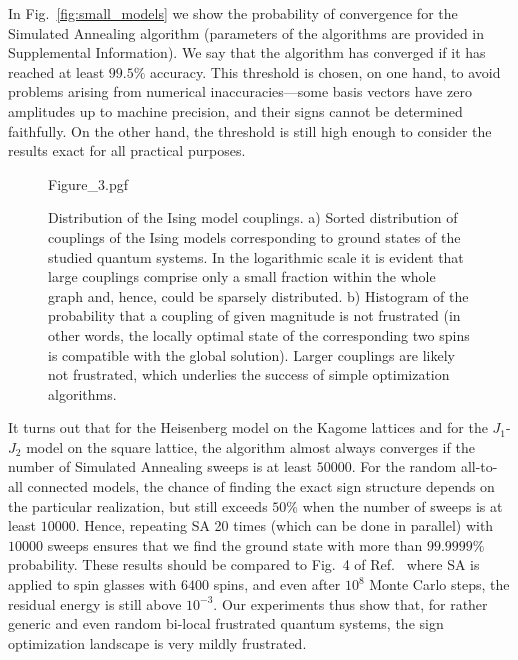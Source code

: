 In Fig.~\ref{fig:small_models} we show the probability of convergence for the Simulated Annealing algorithm (parameters of the algorithms are provided in Supplemental Information). We say that the algorithm has converged if it has reached at least $99.5\%$ accuracy. This threshold is chosen, on one hand, to avoid problems arising from numerical inaccuracies---some basis vectors have zero amplitudes up to machine precision, and their signs cannot be determined faithfully. On the other hand, the threshold is still high enough to consider the results exact for all practical purposes.

\begin{figure}
    \centering
    {Figure_3.pgf}%
    \caption{Distribution of the Ising model couplings. a) Sorted distribution of couplings of the Ising models corresponding to ground states of the studied quantum systems. In the logarithmic scale it is evident that large couplings comprise only a small fraction within the whole graph and, hence, could be sparsely distributed. b) Histogram of the probability that a coupling of given magnitude is not frustrated (in other words, the locally optimal state of the corresponding two spins is compatible with the global solution). Larger couplings are likely not frustrated, which underlies the success of simple optimization algorithms.}
    \label{fig:coupling_distribution}
\end{figure}

It turns out that for the Heisenberg model on the Kagome lattices and for the $J_1$-$J_2$ model on the square lattice, the algorithm almost always converges if the number of Simulated Annealing sweeps is at least $50000$. For the random all-to-all connected models, the chance of finding the exact sign structure depends on the particular realization, but still exceeds $50\%$ when the number of sweeps is at least $10000$. Hence, repeating SA 20 times (which can be done in parallel) with $10000$ sweeps ensures that we find the ground state with more than $99.9999\%$ probability. These results should be compared to Fig.~4 of Ref.~\cite{heim2015quantum} where SA is applied to spin glasses with $6400$ spins, and even after $10^8$ Monte Carlo steps, the residual energy is still above $10^{-3}$. Our experiments thus show that, for rather generic and even random bi-local frustrated quantum systems, the sign optimization landscape is very mildly frustrated.

